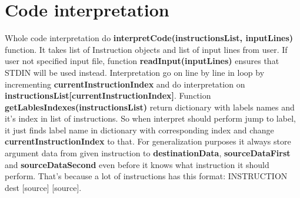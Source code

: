 \documentclass[10pt, a4paper]{article}
\begin{document}
\section*{Code interpretation}
Whole code interpretation do \textbf{interpretCode(instructionsList, inputLines)} function. It takes list of Instruction objects and list of input lines from user. If user not specified input file, function \textbf{readInput(inputLines)} ensures that STDIN will be used instead. Interpretation go on line by line in loop by incrementing \textbf{currentInstructionIndex} and do interpretation on \textbf{instructionsList[currentInstructionIndex]}. Function \textbf{getLablesIndexes(instructionsList)} return dictionary with labels names and it's index in list of instructions. So when interpret should perform jump to label, it just finds label name in dictionary with corresponding index and change \textbf{currentInstructionIndex} to that. For generalization purposes it always store argument data from given instruction to \textbf{destinationData}, \textbf{sourceDataFirst} and \textbf{sourceDataSecond} even before it knows what instruction it should perform. That's because a lot of instructions has this format: INSTRUCTION dest [source] [source].
\end{document}
